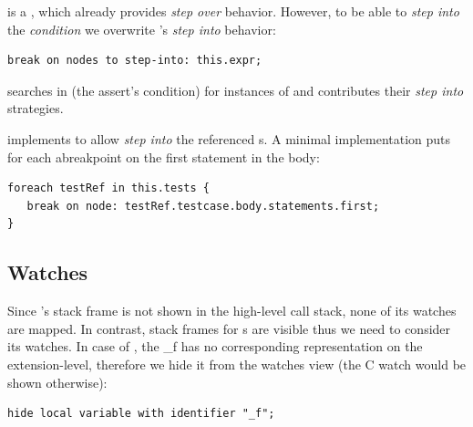 is a , which
already provides \emph{step over} behavior. However, to be able to 
\emph{step into} the \emph{condition} we overwrite 's 
\emph{step into} behavior: 
\begin{lstlisting}[language=debuggerDSL,frame=single]
break on nodes to step-into: this.expr;
\end{lstlisting}

 searches in  (the assert's condition)
for instances of  and contributes their 
\emph{step into} strategies.

 implements  to allow 
\emph{step into} the referenced s. A  
minimal implementation puts for each  abreakpoint on the first
statement in the body:
\begin{lstlisting}[language=debuggerDSL,frame=single]
foreach testRef in this.tests { 
   break on node: testRef.testcase.body.statements.first;
}
\end{lstlisting}

\subsection{Watches} 

Since 's  stack frame is not shown in the high-level
call stack, none of its watches are mapped.
In contrast,  stack frames for s are visible thus we need
to consider its watches. In case of , the 
 \_f has no corresponding representation on
the extension-level, therefore we hide it from the watches view (the C watch
would be shown otherwise):

\begin{lstlisting}[frame=single,language=debuggerDSL]
hide local variable with identifier "_f";
\end{lstlisting}